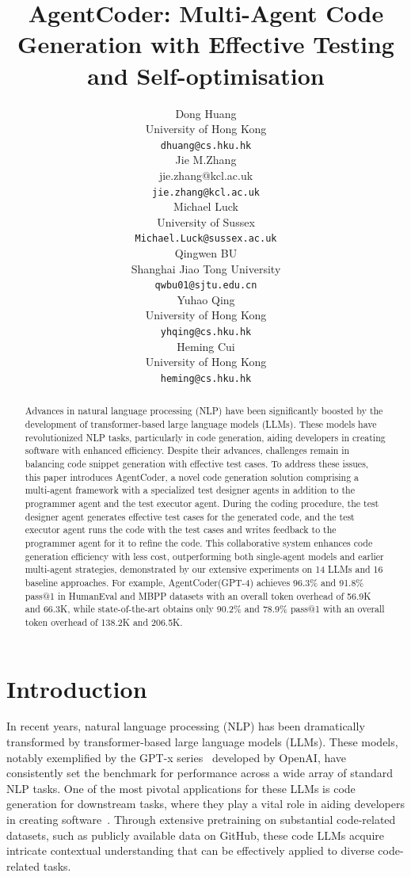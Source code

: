 \documentclass{article}
\title{AgentCoder: Multi-Agent Code Generation with Effective Testing and Self-optimisation}
\author{%
  Dong Huang \\
University of Hong Kong\\
  \texttt{dhuang@cs.hku.hk} \\
  \And
  Jie M.Zhang \\
  jie.zhang@kcl.ac.uk \\
  \texttt{jie.zhang@kcl.ac.uk} \\
  \And
  Michael Luck \\
  University of Sussex \\
  \texttt{Michael.Luck@sussex.ac.uk} \\
  \And
  Qingwen BU \\
  Shanghai Jiao Tong University \\
  \texttt{qwbu01@sjtu.edu.cn} \\
  \And
  Yuhao Qing \\
  University of Hong Kong \\
  \texttt{yhqing@cs.hku.hk} \\
  \And
  Heming Cui \\
  University of Hong Kong \\
  \texttt{heming@cs.hku.hk} \\
}
\newcommand{\xxx}{AgentCoder\xspace}
\begin{document}
\maketitle


\begin{abstract}
Advances in natural language processing (NLP) have been significantly boosted by the development of transformer-based large language models (LLMs). These models have revolutionized NLP tasks, particularly in code generation, aiding developers in creating software with enhanced efficiency. Despite their advances, challenges remain in balancing code snippet generation with effective test cases. To address these issues, this paper introduces \xxx, a novel code generation solution comprising a multi-agent framework with a specialized test designer agents in addition to the programmer agent and the test executor agent. During the coding procedure, the test designer agent generates effective test cases for the generated code, and the test executor agent runs the code with the test cases and writes feedback to the programmer agent for it to refine the code. This collaborative system enhances code generation efficiency with less cost, outperforming both single-agent models and earlier multi-agent strategies, demonstrated by our extensive experiments on 14 LLMs and 16 baseline approaches. For example, \xxx (GPT-4) achieves 96.3\% and 91.8\% pass@1 in HumanEval and MBPP datasets with an overall token overhead of 56.9K and 66.3K, while state-of-the-art obtains only 90.2\% and 78.9\% pass@1 with an overall token overhead of 138.2K and 206.5K. 
\end{abstract}


\section{Introduction}\label{sec:intro}

In recent years, natural language processing (NLP) has been dramatically transformed by transformer-based large language models (LLMs). These models, notably exemplified by the GPT-x series~\cite{brown2020language,OpenAI2023GPT4TR} developed by OpenAI, have consistently set the benchmark for performance across a wide array of standard NLP tasks. One of the most pivotal applications for these LLMs is code generation for downstream tasks, where they play a vital role in aiding developers in creating software~\cite{codebert,wang2021codet5,wang2023codet5+,nijkamp2022codegen,nijkamp2023codegen2,Li2023StarCoderMT}. Through extensive pretraining on substantial code-related datasets, such as publicly available data on GitHub, these code LLMs acquire intricate contextual understanding that can be effectively applied to diverse code-related tasks.
\end{document}
